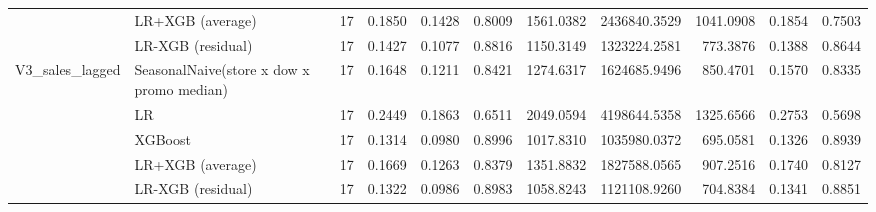 \begin{table}
\begin{tabular}{llrrrrrrrrr}
 & LR+XGB (average) & 17 & 0.1850 & 0.1428 & 0.8009 & 1561.0382 & 2436840.3529 & 1041.0908 & 0.1854 & 0.7503 \\
 & LR-XGB (residual) & 17 & 0.1427 & 0.1077 & 0.8816 & 1150.3149 & 1323224.2581 & 773.3876 & 0.1388 & 0.8644 \\
\cline{1-11}
\multirow[t]{5}{*}{V3\_sales\_lagged} & SeasonalNaive(store x dow x promo median) & 17 & 0.1648 & 0.1211 & 0.8421 & 1274.6317 & 1624685.9496 & 850.4701 & 0.1570 & 0.8335 \\
 & LR & 17 & 0.2449 & 0.1863 & 0.6511 & 2049.0594 & 4198644.5358 & 1325.6566 & 0.2753 & 0.5698 \\
 & XGBoost & 17 & 0.1314 & 0.0980 & 0.8996 & 1017.8310 & 1035980.0372 & 695.0581 & 0.1326 & 0.8939 \\
 & LR+XGB (average) & 17 & 0.1669 & 0.1263 & 0.8379 & 1351.8832 & 1827588.0565 & 907.2516 & 0.1740 & 0.8127 \\
 & LR-XGB (residual) & 17 & 0.1322 & 0.0986 & 0.8983 & 1058.8243 & 1121108.9260 & 704.8384 & 0.1341 & 0.8851 \\
\cline{1-11}
\bottomrule
\end{tabular}
\end{table}
